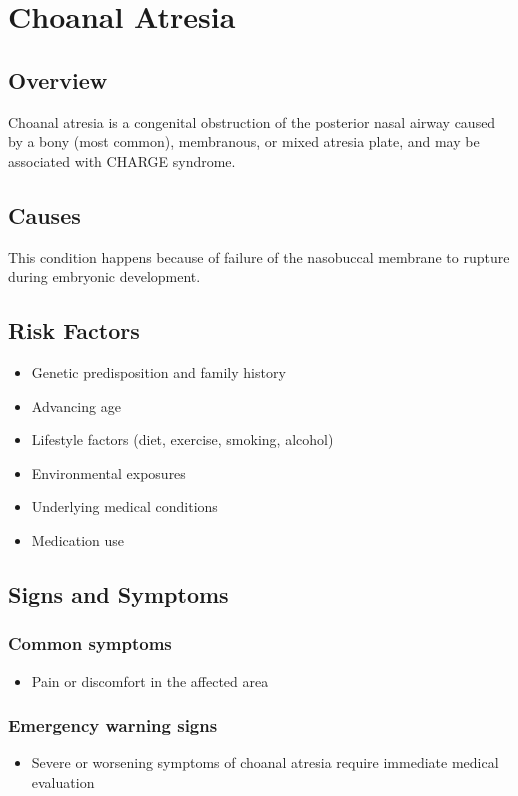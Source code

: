 \chapter{Choanal Atresia}
\label{sec:Choanal Atresia}

\section{Overview}
Choanal atresia is a congenital obstruction of the posterior nasal airway caused by a bony (most common), membranous, or mixed atresia plate, and may be associated with CHARGE syndrome.
\section{Causes}
This condition happens because of failure of the nasobuccal membrane to rupture during embryonic development.     
\section{Risk Factors}

\begin{itemize}[noitemsep]
  \item Genetic predisposition and family history
  \item Advancing age
  \item Lifestyle factors (diet, exercise, smoking, alcohol)
  \item Environmental exposures
  \item Underlying medical conditions
  \item Medication use
\end{itemize}
\section{Signs and Symptoms}

\subsection{Common symptoms}
\begin{itemize}[noitemsep]
  \item Pain or discomfort in the affected area
  \end{itemize}

\subsection{Emergency warning signs}
\begin{itemize}[noitemsep]
  \item Severe or worsening symptoms of choanal atresia require immediate medical evaluation
\end{itemize}
